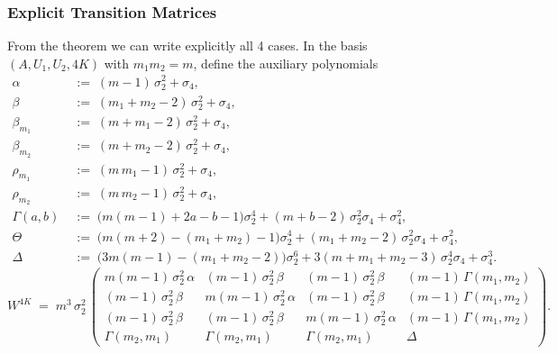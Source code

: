 \documentclass[12pt,a4paper]{article}
\begin{document}
\subsubsection{Explicit Transition Matrices}
From the theorem we can write explicitly all 4 cases.
\noindent In the basis $(A, U_{1}, U_{2}, 4K)$ with $m_{1} m_{2} = m$, define the auxiliary 
polynomials
\begin{align*}
\alpha       &\;:=\; (m-1)\,\sigma_{2}^{2} + \sigma_{4}, 
\\ \beta        &\;:=\; (m_{1}+m_{2}-2)\,\sigma_{2}^{2} + \sigma_{4}, \\
\beta_{m_{1}} &\;:=\; (m+m_{1}-2)\,\sigma_{2}^{2} + \sigma_{4},
\\ \beta_{m_{2}} &\;:=\; (m+m_{2}-2)\,\sigma_{2}^{2} + \sigma_{4}, \\
\rho_{m_{1}}  &\;:=\; (m\,m_{1}-1)\,\sigma_{2}^{2} + \sigma_{4},
\\ \rho_{m_{2}}  &\;:=\; (m\,m_{2}-1)\,\sigma_{2}^{2} + \sigma_{4}, \\[4pt]
\Gamma(a,b)  &\;:=\; \bigl(m(m-1) + 2a - b - 1\bigr)\sigma_{2}^{4}
              + (m+b-2)\,\sigma_{2}^{2}\sigma_{4} + \sigma_{4}^{2}, \\
\Theta       &\;:=\; \bigl(m(m+2) - (m_{1}+m_{2}) - 1\bigr)\sigma_{2}^{4}
              + (m_{1}+m_{2}-2)\,\sigma_{2}^{2}\sigma_{4} + \sigma_{4}^{2}, \\
\Delta       &\;:=\; \bigl(3 m(m-1) - (m_{1}+m_{2}-2)\bigr)\sigma_{2}^{6}
              + 3(m+m_{1}+m_{2}-3)\,\sigma_{2}^{4}\sigma_{4} + \sigma_{4}^{3}.
\end{align*}
\[
W^{4K} \;=\; m^{3}\,\sigma_{2}^{2}\,
\begin{pmatrix}
m(m-1)\,\sigma_{2}^{2}\,\alpha & (m-1)\,\sigma_{2}^{2}\,\beta   & (m-1)\,\sigma_{2}^{2}\,\beta   & (m-1)\,\Gamma(m_{1},m_{2}) \\[2pt]
(m-1)\,\sigma_{2}^{2}\,\beta   & m(m-1)\,\sigma_{2}^{2}\,\alpha & (m-1)\,\sigma_{2}^{2}\,\beta   & (m-1)\,\Gamma(m_{1},m_{2}) \\[2pt]
(m-1)\,\sigma_{2}^{2}\,\beta   & (m-1)\,\sigma_{2}^{2}\,\beta   & m(m-1)\,\sigma_{2}^{2}\,\alpha & (m-1)\,\Gamma(m_{1},m_{2}) \\[2pt]
\Gamma(m_{2},m_{1})            & \Gamma(m_{2},m_{1})            & \Gamma(m_{2},m_{1})            & \Delta
\end{pmatrix}.
\]
\end{document}
